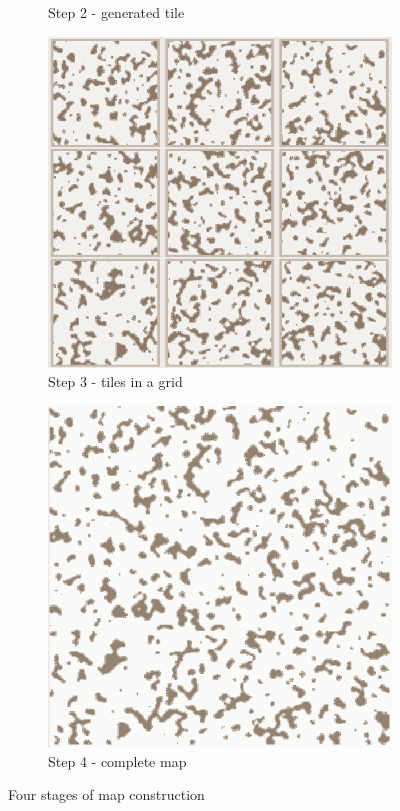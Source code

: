 \documentclass[12pt]{report}
\begin{document}
\begin{figure}[h]
\begin{subfigure}[b]{0.4\textwidth}
		\caption{Step 2 - generated tile} 
	\end{subfigure}
	\hfill
	\begin{subfigure}[b]{0.4\textwidth}
		\centering
		\includegraphics[width=\textwidth]{images/step3}
		\caption{Step 3 - tiles in a grid} 
	\end{subfigure}
	\hfill
	\begin{subfigure}[b]{0.4\textwidth}
		\centering
		\includegraphics[width=\textwidth]{images/step4}
		\caption{Step 4 - complete map} 
	\end{subfigure}
	\caption{Four stages of map construction}
	\label{fig:map_steps}
\end{figure}
\end{document}
